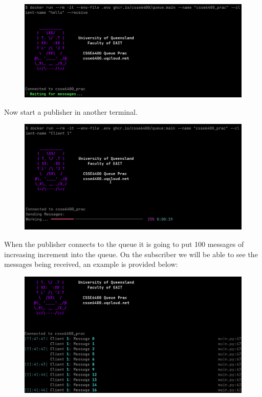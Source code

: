 \documentclass{csse4400}
\begin{document}
\begin{figure}[H]
  \includegraphics[width=\textwidth]{images/stacksub}
\end{figure}

Now start a publisher in another terminal.


\begin{figure}[H]
  \includegraphics[width=\textwidth]{images/stackpub}
\end{figure}

When the publisher connects to the queue it is going to put 100 messages of increasing increment into the queue.
On the subscriber we will be able to see the messages being received, an example is provided below:

\begin{figure}[H]
  \includegraphics[width=\textwidth]{images/stacksubdata}
\end{figure}
\end{document}
